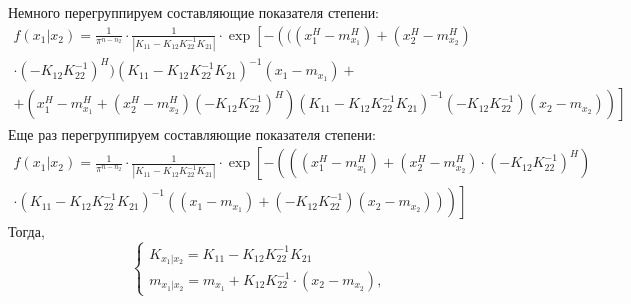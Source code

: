 \documentclass[11pt]{article}
\begin{document}
Немного перегруппируем составляющие показателя степени:
\begin{equation}
\begin{gathered}
f(x_1|x_2)=\frac{1}{\pi^{n-n_2}}\cdot \frac{1}{ |K_{11}-K_{12}K_{22}^{-1}K_{21}|}\cdot \exp \left[-\left(((x_1^H-m_{x_1}^H)+(x_2^H-m_{x_2}^H) \right.\right. \\
\cdot(-K_{12}K_{22}^{-1})^H)(K_{11}-K_{12}K_{22}^{-1}K_{21})^{-1}(x_1-m_{x_1})+ \\
\left.\left.+(x_1^H-m_{x_1}^H+(x_2^H-m_{x_2}^H)(-K_{12}K_{22}^{-1})^H)(K_{11}-K_{12}K_{22}^{-1}K_{21})^{-1}(-K_{12}K_{22}^{-1})(x_2-m_{x_2})\right)\right]
\end{gathered}
\end{equation}
Еще раз перегруппируем составляющие показателя степени:
\begin{equation}
\begin{gathered}
f(x_1|x_2)=\frac{1}{\pi^{n-n_2}}\cdot \frac{1}{ |K_{11}-K_{12}K_{22}^{-1}K_{21}|}\cdot \exp \left[-\left(((x_1^H-m_{x_1}^H)+(x_2^H-m_{x_2}^H)\cdot(-K_{12}K_{22}^{-1})^H) \right.\right. \\
\left.\left. \cdot(K_{11}-K_{12}K_{22}^{-1}K_{21})^{-1}((x_1-m_{x_1})+(-K_{12}K_{22}^{-1})(x_2-m_{x_2}))\right)\right]
\end{gathered}
\end{equation}
Тогда,
\begin{equation}
\left\{ \begin{gathered} 
K_{x_1|x_2} = K_{11}-K_{12}K_{22}^{-1}K_{21} \\
m_{x_1|x_2} = m_{x_1} + K_{12}K_{22}^{-1}\cdot(x_2-m_{x_2}),
\end{gathered} \right.
\end{equation}
\end{document}
